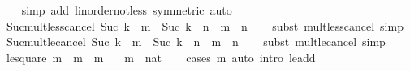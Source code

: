 \begin{isabellebody}
%
\isadelimproof
\ \ %
\endisadelimproof
%
\isatagproof
{}\isamarkupfalse%
\ {\isacharparenleft}{\kern0pt}simp\ add{\isacharcolon}{\kern0pt}\ linorder{\isacharunderscore}{\kern0pt}not{\isacharunderscore}{\kern0pt}less\ {\isacharbrackleft}{\kern0pt}symmetric{\isacharbrackright}{\kern0pt}{\isacharcomma}{\kern0pt}\ auto{\isacharparenright}{\kern0pt}%
\endisatagproof
{\isafoldproof}%
%
\isadelimproof
\isanewline
%
\endisadelimproof
\isanewline
{}\isamarkupfalse%
\ Suc{\isacharunderscore}{\kern0pt}mult{\isacharunderscore}{\kern0pt}less{\isacharunderscore}{\kern0pt}cancel{}{\isacharcolon}{\kern0pt}\ {\isachardoublequoteopen}Suc\ k\ {\isacharasterisk}{\kern0pt}\ m\ {\isacharless}{\kern0pt}\ Suc\ k\ {\isacharasterisk}{\kern0pt}\ n\ {\isasymlongleftrightarrow}\ m\ {\isacharless}{\kern0pt}\ n{\isachardoublequoteclose}\isanewline
%
\isadelimproof
\ \ %
\endisadelimproof
%
\isatagproof
{}\isamarkupfalse%
\ {\isacharparenleft}{\kern0pt}subst\ mult{\isacharunderscore}{\kern0pt}less{\isacharunderscore}{\kern0pt}cancel{}{\isacharparenright}{\kern0pt}\ simp%
\endisatagproof
{\isafoldproof}%
%
\isadelimproof
\isanewline
%
\endisadelimproof
\isanewline
{}\isamarkupfalse%
\ Suc{\isacharunderscore}{\kern0pt}mult{\isacharunderscore}{\kern0pt}le{\isacharunderscore}{\kern0pt}cancel{}{\isacharcolon}{\kern0pt}\ {\isachardoublequoteopen}Suc\ k\ {\isacharasterisk}{\kern0pt}\ m\ {\isasymle}\ Suc\ k\ {\isacharasterisk}{\kern0pt}\ n\ {\isasymlongleftrightarrow}\ m\ {\isasymle}\ n{\isachardoublequoteclose}\isanewline
%
\isadelimproof
\ \ %
\endisadelimproof
%
\isatagproof
{}\isamarkupfalse%
\ {\isacharparenleft}{\kern0pt}subst\ mult{\isacharunderscore}{\kern0pt}le{\isacharunderscore}{\kern0pt}cancel{}{\isacharparenright}{\kern0pt}\ simp%
\endisatagproof
{\isafoldproof}%
%
\isadelimproof
\isanewline
%
\endisadelimproof
\isanewline
{}\isamarkupfalse%
\ le{\isacharunderscore}{\kern0pt}square{\isacharcolon}{\kern0pt}\ {\isachardoublequoteopen}m\ {\isasymle}\ m\ {\isacharasterisk}{\kern0pt}\ m{\isachardoublequoteclose}\isanewline
\ \ \ m\ {\isacharcolon}{\kern0pt}{\isacharcolon}{\kern0pt}\ nat\isanewline
%
\isadelimproof
\ \ %
\endisadelimproof
%
\isatagproof
{}\isamarkupfalse%
\ {\isacharparenleft}{\kern0pt}cases\ m{\isacharparenright}{\kern0pt}\ {\isacharparenleft}{\kern0pt}auto\ intro{\isacharcolon}{\kern0pt}\ le{\isacharunderscore}{\kern0pt}add{}{\isacharparenright}{\kern0pt}%
\endisatagproof
{\isafoldproof}%
%
\isadelimproof

\end{isabellebody}
